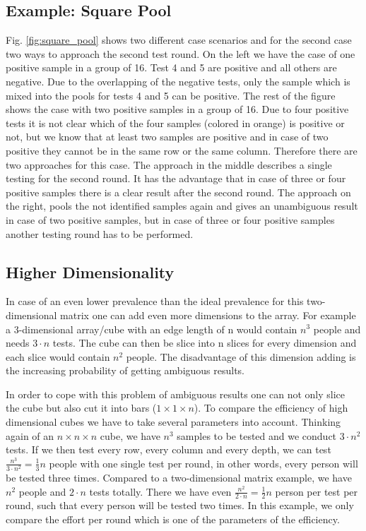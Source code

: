 \documentclass[fleqn,10pt]{wlscirep}
\begin{document}
	\subsection{Example: Square Pool}
	Fig. \ref{fig:square_pool} shows two different case scenarios and for the second case two ways to approach the second test round. On the left we have the case of one positive sample in a group of 16. Test 4 and 5 are positive and all others are negative. Due to the overlapping of the negative tests, only the sample which is mixed into the pools for tests 4 and 5 can be positive. 
	The rest of the figure shows the case with two positive samples in a group of 16. Due to four positive tests it is not clear which of the four samples (colored in orange) is positive or not, but we know that at least two samples are positive and in case of two positive they cannot be in the same row or the same column. Therefore there are two approaches for this case. The approach in the middle describes a single testing for the second round. It has the advantage that in case of three or four positive samples there is a clear result after the second round. The approach on the right, pools the not identified samples again and gives an unambiguous result in case of two positive samples, but in case of three or four positive samples another testing round has to be performed. 
	
	
	\subsection{Higher Dimensionality}
	
	In case of an even lower prevalence than the ideal prevalence for this two-dimensional matrix one can add even more dimensions to the array. 
	For example a  3-dimensional array/cube with an edge length of n would contain $n^3$ people and needs $3 \cdot n$ tests. The cube can then be slice into n slices for every dimension and each slice would contain $n^2$ people. The disadvantage of this dimension adding is the increasing probability of getting ambiguous results. 
	
	In order to cope with this problem of ambiguous results one can not only slice the cube but also cut it into bars ($ 1 \times 1 \times n$). 
	To compare the efficiency of high dimensional cubes we have to take several parameters into account. Thinking again of an $ n \times n \times n$ cube, we have $n^3$ samples to be tested and we conduct $3 \cdot n^2$ tests. If we then test every row, every column and every depth, we can test $\frac{n^3}{3 \cdot n^2}= \frac{1}{3}n$ people with one single test per round, in other words, every person will be tested three times. Compared to a two-dimensional matrix example, we have $n^2$ people and $2 \cdot n$ tests totally. There we have even $\frac{n^2}{2 \cdot n} = \frac{1}{2}n$ person per test per round, such that every person will be tested two times. In this example, we only compare the effort per round which is one of the parameters of the efficiency. 
	
	
\end{document}
